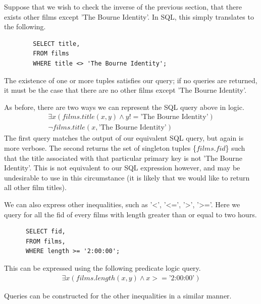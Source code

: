 \documentclass[a4paper, 11pt]{article}
\begin{document}
      Suppose that we wish to check the inverse of the previous section, that
      there exists other films except 'The Bourne Identity'. In SQL, this
      simply translates to the following.

      \begin{verbatim}
        SELECT title,
        FROM films
        WHERE title <> 'The Bourne Identity';
      \end{verbatim}

      The existence of one or more tuples satisfies our query; if no queries
      are returned, it must be the case that there are no other films except
      'The Bourne Identity'.

      As before, there are two ways we can represent the SQL query above in
      logic.
      \begin{gather}
        \exists x(films.title(x, y) \land y !=  \text{'The Bourne
        Identity'})\label{where3}\\
        \lnot films.title(x, \text{'The Bourne Identity'})\label{where4}
      \end{gather}
      The first query matches the output of our equivalent SQL query, but again
      is more verbose. The second returns the set of singleton tuples
      \{$films.fid$\} such that the title associated with that particular
      primary key is not 'The Bourne Identity'. This is not equivalent to our
      SQL expression however, and may be undesirable to use in this
      circumstance (it is likely that we would like to return all other film
      titles).


      We can also express other inequalities, such as '<', '<=', '>', '>='.
      Here we query for all the fid of every films with length greater than or
      equal to two hours.

      \begin{verbatim}
      SELECT fid,
      FROM films,
      WHERE length >= '2:00:00';
      \end{verbatim}

      This can be expressed using the following predicate logic query.
      \begin{gather}
        \exists x(films.length(x, y) \land x >= \text{'2:00:00'}) \label{where5}
      \end{gather}

      Queries can be constructed for the other inequalities in a
      similar manner.
\end{document}

